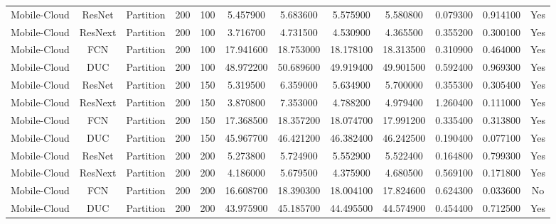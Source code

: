 \begin{tabular}{|c||c||c||c||c||c||c||c||c||c||c||c|}
Mobile-Cloud & ResNet & Partition & 200 & 100 & 5.457900 & 5.683600 & 5.575900 & 5.580800 & 0.079300 & 0.914100 & Yes \\
Mobile-Cloud & ResNext & Partition & 200 & 100 & 3.716700 & 4.731500 & 4.530900 & 4.365500 & 0.355200 & 0.300100 & Yes \\
Mobile-Cloud & FCN & Partition & 200 & 100 & 17.941600 & 18.753000 & 18.178100 & 18.313500 & 0.310900 & 0.464000 & Yes \\
Mobile-Cloud & DUC & Partition & 200 & 100 & 48.972200 & 50.689600 & 49.919400 & 49.901500 & 0.592400 & 0.969300 & Yes \\
Mobile-Cloud & ResNet & Partition & 200 & 150 & 5.319500 & 6.359000 & 5.634900 & 5.700000 & 0.355300 & 0.305400 & Yes \\
Mobile-Cloud & ResNext & Partition & 200 & 150 & 3.870800 & 7.353000 & 4.788200 & 4.979400 & 1.260400 & 0.111000 & Yes \\
Mobile-Cloud & FCN & Partition & 200 & 150 & 17.368500 & 18.357200 & 18.074700 & 17.991200 & 0.335400 & 0.313800 & Yes \\
Mobile-Cloud & DUC & Partition & 200 & 150 & 45.967700 & 46.421200 & 46.382400 & 46.242500 & 0.190400 & 0.077100 & Yes \\
Mobile-Cloud & ResNet & Partition & 200 & 200 & 5.273800 & 5.724900 & 5.552900 & 5.522400 & 0.164800 & 0.799300 & Yes \\
Mobile-Cloud & ResNext & Partition & 200 & 200 & 4.186000 & 5.679500 & 4.375900 & 4.680500 & 0.569100 & 0.171800 & Yes \\
Mobile-Cloud & FCN & Partition & 200 & 200 & 16.608700 & 18.390300 & 18.004100 & 17.824600 & 0.624300 & 0.033600 & No \\
Mobile-Cloud & DUC & Partition & 200 & 200 & 43.975900 & 45.185700 & 44.495500 & 44.574900 & 0.454400 & 0.712500 & Yes \\
\bottomrule
\end{tabular}
